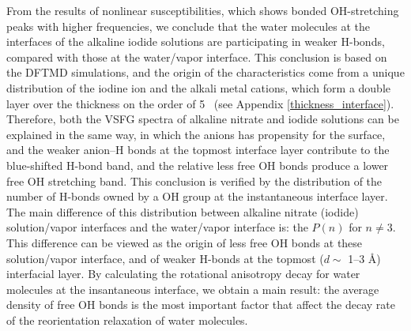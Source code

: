 From the results of nonlinear susceptibilities, which shows bonded OH-stretching peaks with higher frequencies, 
we conclude that the water molecules at the interfaces of the alkaline iodide solutions are participating 
in weaker H-bonds, compared with those at the water/vapor interface. 
This conclusion is based on the DFTMD simulations, and %
the origin of the characteristics come from a unique distribution of the iodine ion and the alkali metal cations, 
which form a double layer \cite{Shultz2010} over the thickness on the order of 5 \A\ (see Appendix \ref{thickness_interface}).
Therefore, both the VSFG spectra of alkaline nitrate and iodide solutions can be explained in the same way, 
in which the anions has propensity for the surface, and the weaker anion--H bonds at the topmost interface layer contribute to the blue-shifted H-bond band,
and the relative less free OH bonds produce a lower free OH stretching band.
This conclusion is verified by the distribution of the number of H-bonds owned by a OH group at the instantaneous interface layer. 
The main difference of this distribution between alkaline nitrate (iodide) solution/vapor interfaces and the water/vapor interface is:
the $P(n)$ for $n\ne 3$. This difference can be viewed as the origin of less free OH bonds at these solution/vapor interface, 
and of weaker H-bonds at the topmost ($d \sim$ 1--3 \AA) interfacial layer.
By calculating the rotational anisotropy decay for water molecules at the insantaneous interface, 
we obtain a main result: the average density of free OH bonds is the most important factor that affect the decay rate of the reorientation relaxation of water molecules.


